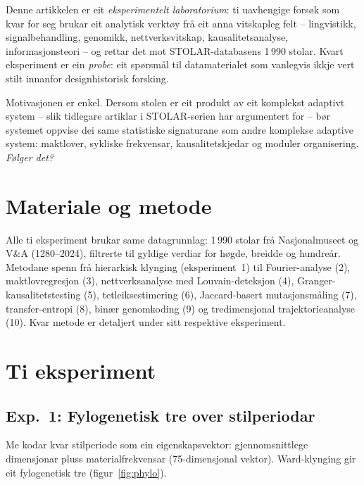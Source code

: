 \documentclass[10pt, a4paper, twocolumn]{article}
\begin{document}
Denne artikkelen er eit \emph{eksperimentelt laboratorium}: ti uavhengige fors\o{}k som kvar for seg brukar eit analytisk verkt\o{}y fr\aa{} eit anna vitskapleg felt -- lingvistikk, signalbehandling, genomikk, nettverksvitskap, kausalitetsanalyse, informasjonsteori -- og rettar det mot STOLAR-databasens 1\,990 stolar. Kvart eksperiment er ein \emph{probe}: eit sp\o{}rsm\aa{}l til datamaterialet som vanlegvis ikkje vert stilt innanfor designhistorisk forsking.

Motivasjonen er enkel. Dersom stolen er eit produkt av eit komplekst adaptivt system -- slik tidlegare artiklar i STOLAR-serien har argumentert for \citep{finne2026} -- b\o{}r systemet oppvise dei same statistiske signaturane som andre komplekse adaptive system: maktlover, sykliske frekvensar, kausalitetskjedar og moduler organisering. \emph{F\o{}lger det?}


\section{Materiale og metode}

Alle ti eksperiment brukar same datagrunnlag: 1\,990 stolar fr\aa{} Nasjonalmuseet og V\&A (1280--2024), filtrerte til gyldige verdiar for h\o{}gde, breidde og hundre\aa{}r. Metodane spenn fr\aa{} hierarkisk klynging (eksperiment~1) til Fourier-analyse (2), maktlovregresjon (3), nettverksanalyse med Louvain-deteksjon (4), Granger-kausalitetstesting (5), tetleiksestimering (6), Jaccard-basert mutasjonsm\aa{}ling (7), transfer-entropi (8), bin\ae{}r genomkoding (9) og tredimensjonal trajektorieanalyse (10). Kvar metode er detaljert under sitt respektive eksperiment.


\section{Ti eksperiment}

\subsection{Exp.~1: Fylogenetisk tre over stilperiodar}

Me kodar kvar stilperiode som ein eigenskapsvektor: gjennomsnittlege dimensjonar pluss materialfrekvensar (75-dimensjonal vektor). Ward-klynging gir eit fylogenetisk tre (figur~\ref{fig:phylo}).
\end{document}
